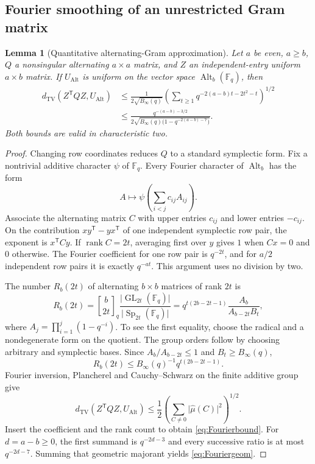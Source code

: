 \documentclass[11pt]{article}
\numberwithin{equation}{section}
\newtheorem{lemma}[theorem]{Lemma}
\theoremstyle{definition}
\theoremstyle{remark}
\newcommand{\F}{\mathbb F}
\newcommand{\TV}{d_{\mathrm{TV}}}
\newcommand{\Alt}{\operatorname{Alt}}
\newcommand{\Sp}{\operatorname{Sp}}
\newcommand{\GL}{\operatorname{GL}}
\newcommand{\rank}{\operatorname{rank}}
\newcommand{\tr}{\mathsf T}
\newcommand{\qbin}[2]{\genfrac{[}{]}{0pt}{}{#1}{#2}_{q}}
\newcommand{\abs}[1]{\lvert#1\rvert}
\newcommand{\Binf}{B_\infty(q)}
\begin{document}
\subsection{Fourier smoothing of an unrestricted Gram matrix}
\begin{lemma}[Quantitative alternating-Gram approximation]\label{lem:Fourier}
Let $a$ be even, $a\ge b$, $Q$ a nonsingular alternating $a\times a$ matrix, and $Z$ an independent-entry uniform $a\times b$ matrix. If $U_{\Alt}$ is uniform on the vector space $\Alt_b(\F_q)$, then
\begin{align}
 \TV(Z^\tr QZ,U_{\Alt})
 &\le\frac{1}{2\sqrt{\Binf}}
 \left(\sum_{t\ge1}q^{-2(a-b)t-2t^2-t}\right)^{1/2}\label{eq:Fourierbound}\\
 &\le\frac{q^{-(a-b)-3/2}}
 {2\sqrt{\Binf\bigl(1-q^{-2(a-b)-7}\bigr)}}.
 \label{eq:Fouriergeom}
\end{align}
Both bounds are valid in characteristic two.
\end{lemma}
\begin{proof}
Changing row coordinates reduces $Q$ to a standard symplectic form. Fix a nontrivial additive character $\psi$ of $\F_q$. Every Fourier character of $\Alt_b$ has the form
\[
 A\longmapsto\psi\left(\sum_{i<j}c_{ij}A_{ij}\right).
\]
Associate the alternating matrix $C$ with upper entries $c_{ij}$ and lower entries $-c_{ij}$. On the contribution $xy^\tr-yx^\tr$ of one independent symplectic row pair, the exponent is $x^\tr Cy$. If $\rank C=2t$, averaging first over $y$ gives $1$ when $Cx=0$ and $0$ otherwise. The Fourier coefficient for one row pair is $q^{-2t}$, and for $a/2$ independent row pairs it is exactly $q^{-at}$. This argument uses no division by two.

The number $R_b(2t)$ of alternating $b\times b$ matrices of rank $2t$ is
\begin{equation}\label{eq:altcount}
 R_b(2t)=\qbin b{2t}\frac{\abs{\GL_{2t}(\F_q)}}{\abs{\Sp_{2t}(\F_q)}}
 =q^{t(2b-2t-1)}\frac{A_b}{A_{b-2t}B_t},
\end{equation}
where $A_j=\prod_{i=1}^j(1-q^{-i})$. To see the first equality, choose the radical and a nondegenerate form on the quotient. The group orders follow by choosing arbitrary and symplectic bases. Since $A_b/A_{b-2t}\le1$ and $B_t\ge\Binf$,
\[
 R_b(2t)\le\Binf^{-1}q^{t(2b-2t-1)}.
\]
Fourier inversion, Plancherel and Cauchy--Schwarz on the finite additive group give
\[
 \TV(Z^\tr QZ,U_{\Alt})
 \le\frac12\left(\sum_{C\ne0}\abs{\widehat\mu(C)}^2\right)^{1/2}.
\]
Insert the coefficient and the rank count to obtain \eqref{eq:Fourierbound}. For $d=a-b\ge0$, the first summand is $q^{-2d-3}$ and every successive ratio is at most $q^{-2d-7}$. Summing that geometric majorant yields \eqref{eq:Fouriergeom}.
\end{proof}
\end{document}
